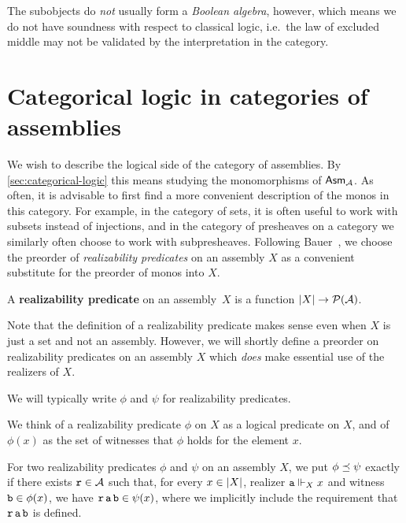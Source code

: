 The subobjects do \emph{not} usually form a \emph{Boolean algebra}, however,
which means we do not have soundness with respect to classical logic, i.e.\ the
law of excluded middle may not be validated by the interpretation in the
category.


\section{Categorical logic in categories of assemblies}\label{sec:cat-logic-in-asm}

We wish to describe the logical side of the category of assemblies. By
\cref{sec:categorical-logic} this means studying the monomorphisms of
\(\mathsf{Asm}_{\mathcal A}\).
%
As often, it is advisable to first find a more convenient description of the
monos in this category. For example, in the category of sets, it is often useful
to work with subsets instead of injections, and in the category of presheaves on
a category we similarly often choose to work with subpresheaves.
%
Following Bauer~\cite{Bauer2023}, we choose the preorder of \emph{realizability
  predicates} on an assembly \(X\) as a convenient substitute for the preorder of
monos into \(X\).
%


\begin{definition}
  A \textbf{realizability predicate} on an assembly~\(X\) is a function
  \(\lvert X\rvert \to \mathcal P(\mathcal A)\).
\end{definition}

Note that the definition of a realizability predicate makes sense even when
\(X\) is just a set and not an assembly. However, we will shortly define a
preorder on realizability predicates on an assembly \(X\) which \emph{does} make
essential use of the realizers of \(X\).

\begin{notation}
  We will typically write \(\phi\) and \(\psi\) for realizability predicates.
\end{notation}

We think of a realizability predicate \(\phi\) on \(X\) as a logical predicate
on \(X\), and of \(\phi(x)\) as the set of witnesses that \(\phi\) holds for the
element \(x\).

\begin{definition}
  For two realizability predicates \(\phi\) and \(\psi\) on an assembly \(X\),
  we put \( \phi \preceq \psi \) exactly if there exists \(\operatorname{\mathtt{r}} \in \mathcal A\)
  such that, for every \(x \in \lvert X\rvert\), realizer \(\operatorname{\mathtt{a}} \Vdash_X x\)
  and witness \(\operatorname{\mathtt{b}} \in \phi(x)\), we have
  \(\operatorname{\mathtt{r}}\operatorname{\mathtt{a}}\operatorname{\mathtt{b}} \in \psi(x)\),
  where we implicitly include the requirement that \(\operatorname{\mathtt{r}}\operatorname{\mathtt{a}}\operatorname{\mathtt{b}}\) is defined.
\end{definition}

